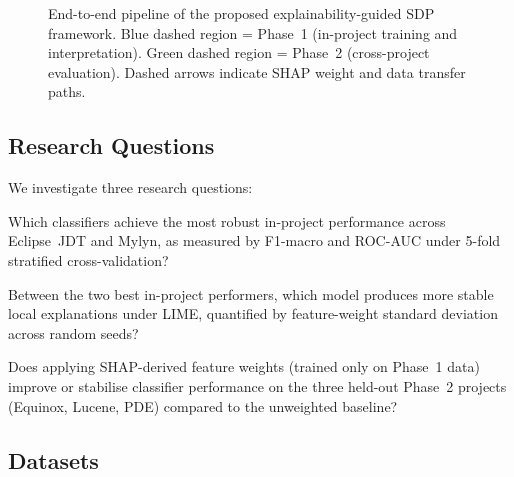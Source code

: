 \documentclass[12pt, a4paper]{article}
\newcommand{\RQ}[1]{\textbf{RQ#1}}
\begin{document}
\begin{figure}[H]
\caption{End-to-end pipeline of the proposed explainability-guided SDP
framework. Blue dashed region = Phase~1 (in-project training and
interpretation). Green dashed region = Phase~2 (cross-project evaluation).
Dashed arrows indicate SHAP weight and data transfer paths.}
\label{fig:pipeline}
\end{figure}

\subsection{Research Questions}
\label{sec:rq}

We investigate three research questions:

\begin{description}[leftmargin=1.5em, itemsep=3pt]
  \item[\RQ{1}] Which classifiers achieve the most robust in-project
    performance across Eclipse~JDT and Mylyn, as measured by F1-macro and
    ROC-AUC under 5-fold stratified cross-validation?

  \item[\RQ{2}] Between the two best in-project performers, which model
    produces more stable local explanations under LIME, quantified by
    feature-weight standard deviation across random seeds?

  \item[\RQ{3}] Does applying SHAP-derived feature weights (trained only on
    Phase~1 data) improve or stabilise classifier performance on the three
    held-out Phase~2 projects (Equinox, Lucene, PDE) compared to the
    unweighted baseline?
\end{description}

\subsection{Datasets}
\label{sec:data}
\end{document}
